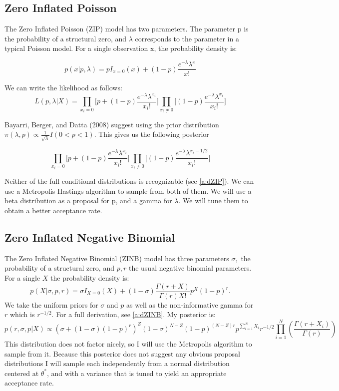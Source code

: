 \documentclass{article}\usepackage[]{graphicx}\usepackage[]{color}
\begin{document}
\subsection{Zero Inflated Poisson}
\label{ss:mZiPoisson}
The Zero Inflated Poisson (ZIP) model has two parameters. The parameter p is the probability of a structural zero, and $\lambda$ corresponds to the parameter in a typical Poisson model. For a single observation x, the probability density is:

\[
p(x|p, \lambda) = pI_{x=0}(x) + (1-p)\frac{e^{-\lambda}\lambda^x}{x!}
\]
 
 
\noindent We can write the likelihood as follows:
$$
L(p, \lambda|X) = \prod_{x_i=0}\bigg[p+(1-p)\frac{e^{-\lambda}\lambda^{x_i}}{x_i!}\bigg]\prod_{x_i \ne 0}\bigg[(1-p)\frac{e^{-\lambda}\lambda^{x_i}}{x_i!}\bigg]
$$

\noindent Bayarri, Berger, and Datta (2008) suggest using the prior distribution $\pi(\lambda, p) \propto \frac{1}{\sqrt{\lambda}}I(0<p<1)$. This gives us the following posterior 

\[
\prod_{x_i=0}\bigg[p+(1-p)\frac{e^{-\lambda}\lambda^{x_i}}{x_i!}\bigg]\prod_{x_i \ne 0}\bigg[(1-p)\frac{e^{-\lambda}\lambda^{x_i - 1/2}}{x_i!}\bigg]
\]

\noindent Neither of the full conditional distributions is recognizable (see \ref{a:dZIP}). We can use a Metropolis-Hastings algorithm to sample from both of them. We will use a beta distribution as a proposal for p, and a gamma for $\lambda$. We will tune them to obtain a better acceptance rate. 


\subsection{Zero Inflated Negative Binomial}
\label{ss:mZiNBinom}
The Zero Inflated Negative Binomial (ZINB) model has three parameters $\sigma,$ the probability of a structural zero, and $p,r$ the usual negative binomial parameters. 
For a single $X$ the probability density is: 
$$p(X|\sigma, p, r) = \sigma I_{X=0}(X) + (1-\sigma)\frac{\Gamma(r+X)}{\Gamma(r)X!}p^X(1-p)^r.$$
We take the uniform priors for $\sigma$ and $p$ as well as the non-informative gamma for $r$ which is $r^{-1/2}$. For a full derivation, see \ref{a:dZINB}. My posterior is:
$$p(r,\sigma, p|X)\propto\left(\sigma + (1-\sigma)(1-p)^r\right)^Z(1-\sigma)^{N-Z}(1-p)^{(N-Z)r}p^{\sum_{i=1}^NX_i}r^{-1/2}\prod_{i=1}^N\left(\frac{\Gamma(r+X_i)}{\Gamma(r)}\right)$$
This distribution does not factor nicely, so I will use the Metropolis algorithm to sample from it. Because this posterior does not suggest any obvious proposal distributions I will sample each independently from a normal distribution centered at $\theta^*$, and with a variance that is tuned to yield an appropriate acceptance rate.
\end{document}
